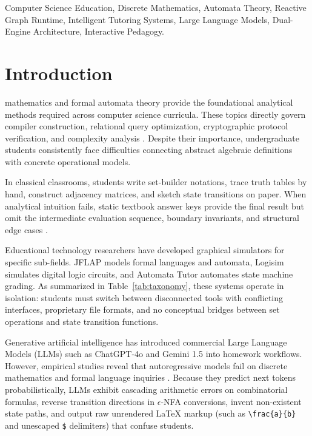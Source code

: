 \documentclass[conference]{IEEEtran}
\begin{document}
\begin{IEEEkeywords}
Computer Science Education, Discrete Mathematics, Automata Theory, Reactive Graph Runtime, Intelligent Tutoring Systems, Large Language Models, Dual-Engine Architecture, Interactive Pedagogy.
\end{IEEEkeywords}

\section{Introduction}
 mathematics and formal automata theory provide the foundational analytical methods required across computer science curricula. These topics directly govern compiler construction, relational query optimization, cryptographic protocol verification, and complexity analysis \cite{rodger2006jflap, burch2002logisim}. Despite their importance, undergraduate students consistently face difficulties connecting abstract algebraic definitions with concrete operational models.

In classical classrooms, students write set-builder notations, trace truth tables by hand, construct adjacency matrices, and sketch state transitions on paper. When analytical intuition fails, static textbook answer keys provide the final result but omit the intermediate evaluation sequence, boundary invariants, and structural edge cases \cite{alqasemi2024hallucinations, kumar2023evaluating}.

Educational technology researchers have developed graphical simulators for specific sub-fields. JFLAP \cite{rodger2006jflap} models formal languages and automata, Logisim \cite{burch2002logisim} simulates digital logic circuits, and Automata Tutor \cite{dantoni2020automata} automates state machine grading. As summarized in Table~\ref{tab:taxonomy}, these systems operate in isolation: students must switch between disconnected tools with conflicting interfaces, proprietary file formats, and no conceptual bridges between set operations and state transition functions.

Generative artificial intelligence has introduced commercial Large Language Models (LLMs) such as ChatGPT-4o \cite{achiam2023gpt4} and Gemini 1.5 \cite{gemini2024team} into homework workflows. However, empirical studies reveal that autoregressive models fail on discrete mathematics and formal language inquiries \cite{alqasemi2024hallucinations, kumar2023evaluating}. Because they predict next tokens probabilistically, LLMs exhibit cascading arithmetic errors on combinatorial formulas, reverse transition directions in $\epsilon$-NFA conversions, invent non-existent state paths, and output raw unrendered \LaTeX{} markup (such as \texttt{\textbackslash frac\{a\}\{b\}} and unescaped \texttt{\$} delimiters) that confuse students.
\end{document}

